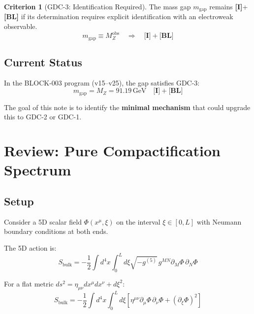 \documentclass[11pt,a4paper]{article}
\newcommand{\mgap}{m_{\mathrm{gap}}}
\newcommand{\MZ}{M_Z}
\newcommand{\GeV}{\,\mathrm{GeV}}
\newcommand{\tagI}{\textbf{[I]}}
\newcommand{\tagBL}{\textbf{[BL]}}
\theoremstyle{definition}
\newtheorem{criterion}{Criterion}[section]
\theoremstyle{plain}
\theoremstyle{remark}
\begin{document}
\begin{criterion}[GDC-3: Identification Required]
\label{crit:gdc3}
The mass gap $\mgap$ remains \tagI{}+\tagBL{} if its determination requires explicit
identification with an electroweak observable.
\begin{equation}
\boxed{\mgap \equiv \MZ^{\mathrm{obs}} \quad \Rightarrow \quad \tagI{}+\tagBL{}}
\label{eq:gdc3}
\end{equation}
\end{criterion}

\subsection{Current Status}

In the BLOCK-003 program (v15--v25), the gap satisfies GDC-3:
\begin{equation}
\mgap = \MZ = 91.19\GeV \quad \tagI{}+\tagBL{}
\label{eq:current-status}
\end{equation}

The goal of this note is to identify the \textbf{minimal mechanism} that could
upgrade this to GDC-2 or GDC-1.

\section{Review: Pure Compactification Spectrum}
\label{sec:pure}

\subsection{Setup}

Consider a 5D scalar field $\Phi(x^\mu, \xi)$ on the interval $\xi \in [0, L]$
with Neumann boundary conditions at both ends.

The 5D action is:
\begin{equation}
S_{\mathrm{bulk}} = -\frac{1}{2}\int d^4x \int_0^L d\xi \sqrt{-g^{(5)}} \, g^{MN}\partial_M\Phi\,\partial_N\Phi
\label{eq:bulk-action}
\end{equation}

For a flat metric $ds^2 = \eta_{\mu\nu}dx^\mu dx^\nu + d\xi^2$:
\begin{equation}
S_{\mathrm{bulk}} = -\frac{1}{2}\int d^4x \int_0^L d\xi \left[ \eta^{\mu\nu}\partial_\mu\Phi\,\partial_\nu\Phi + (\partial_\xi\Phi)^2 \right]
\label{eq:bulk-action-flat}
\end{equation}
\end{document}

